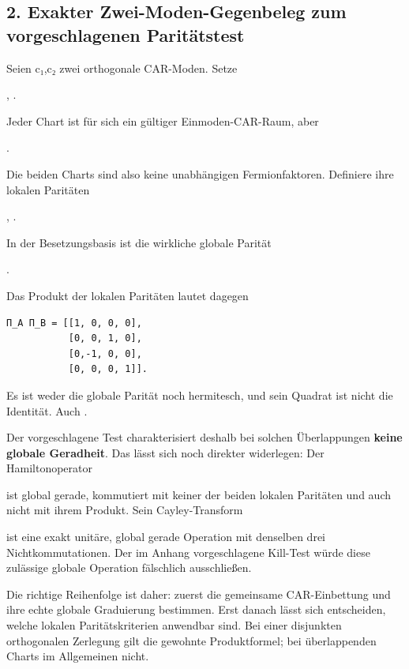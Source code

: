 \subsection{2. Exakter Zwei-Moden-Gegenbeleg zum vorgeschlagenen
Paritätstest}\label{exakter-zwei-moden-gegenbeleg-zum-vorgeschlagenen-parituxe4tstest}

Seien c₁,c₂ zwei orthogonale CAR-Moden. Setze

, .

Jeder Chart ist für sich ein gültiger Einmoden-CAR-Raum, aber

.

Die beiden Charts sind also keine unabhängigen Fermionfaktoren.
Definiere ihre lokalen Paritäten

, .

In der Besetzungsbasis  ist die wirkliche
globale Parität

.

Das Produkt der lokalen Paritäten lautet dagegen

\begin{verbatim}
Π_A Π_B = [[1, 0, 0, 0],
           [0, 0, 1, 0],
           [0,-1, 0, 0],
           [0, 0, 0, 1]].
\end{verbatim}

Es ist weder die globale Parität noch hermitesch, und sein Quadrat ist
nicht die Identität. Auch .

Der vorgeschlagene Test  charakterisiert
deshalb bei solchen Überlappungen \textbf{keine globale Geradheit}. Das
lässt sich noch direkter widerlegen: Der Hamiltonoperator


ist global gerade, kommutiert mit keiner der beiden lokalen Paritäten
und auch nicht mit ihrem Produkt. Sein Cayley-Transform


ist eine exakt unitäre, global gerade Operation mit denselben drei
Nichtkommutationen. Der im Anhang vorgeschlagene Kill-Test würde diese
zulässige globale Operation fälschlich ausschließen.

Die richtige Reihenfolge ist daher: zuerst die gemeinsame CAR-Einbettung
und ihre echte globale Graduierung bestimmen. Erst danach lässt sich
entscheiden, welche lokalen Paritätskriterien anwendbar sind. Bei einer
disjunkten orthogonalen Zerlegung gilt die gewohnte Produktformel; bei
überlappenden Charts im Allgemeinen nicht.

